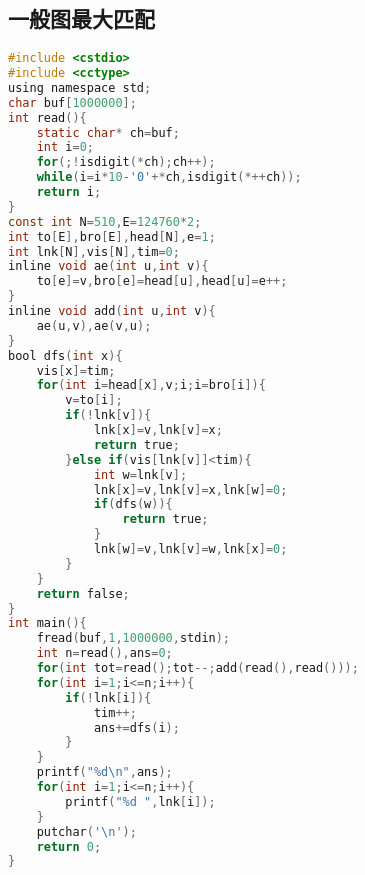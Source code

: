 \subsection{一般图最大匹配}
\begin{lstlisting}[language=C]
#include <cstdio>
#include <cctype>
using namespace std;
char buf[1000000];
int read(){
	static char* ch=buf;
	int i=0;
	for(;!isdigit(*ch);ch++);
	while(i=i*10-'0'+*ch,isdigit(*++ch));
	return i;
}
const int N=510,E=124760*2;
int to[E],bro[E],head[N],e=1;
int lnk[N],vis[N],tim=0;
inline void ae(int u,int v){
	to[e]=v,bro[e]=head[u],head[u]=e++;
}
inline void add(int u,int v){
	ae(u,v),ae(v,u);
}
bool dfs(int x){
	vis[x]=tim;
	for(int i=head[x],v;i;i=bro[i]){
		v=to[i];
		if(!lnk[v]){
			lnk[x]=v,lnk[v]=x;
			return true;
		}else if(vis[lnk[v]]<tim){
			int w=lnk[v];
			lnk[x]=v,lnk[v]=x,lnk[w]=0;
			if(dfs(w)){
				return true;
			}
			lnk[w]=v,lnk[v]=w,lnk[x]=0;
		}
	}
	return false;
}
int main(){
	fread(buf,1,1000000,stdin);
	int n=read(),ans=0;
	for(int tot=read();tot--;add(read(),read()));
	for(int i=1;i<=n;i++){
		if(!lnk[i]){
			tim++;
			ans+=dfs(i);
		}
	}
	printf("%d\n",ans);
	for(int i=1;i<=n;i++){
		printf("%d ",lnk[i]);
	}
	putchar('\n');
	return 0;
}
\end{lstlisting}